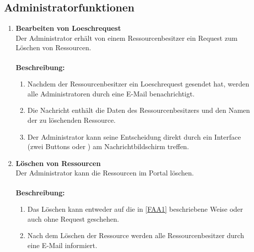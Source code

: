 \documentclass[parskip=full,11pt]{scrartcl}
\def\threedigits#1{%
  \ifnum#1<10 0\fi
  \ifnum#1<1 0\fi
  \number#1}
\begin{document}
\subsection{Administratorfunktionen}
\begin{enumerate}[label={\textbf{/F\protect\threedigits{\theenumi}0/}}, leftmargin=*, resume]
\item \label{FAA1}\textbf{Bearbeiten von Loeschrequest}\\ Der Administrator erhält von einem Ressourcenbesitzer ein Request zum Löschen von Ressourcen.\\\\
\textbf{Beschreibung:}\\
\begin{enumerate}[label=(\arabic*), leftmargin=*]
\item Nachdem der Ressourcenbesitzer ein Loeschrequest gesendet hat, werden alle Administratoren durch eine E-Mail benachrichtigt.\\
\item Die Nachricht enthält die Daten des Ressourcenbesitzers und den Namen der zu löschenden Ressource.\\ 
\item Der Administrator kann seine Entscheidung direkt durch ein Interface (zwei Buttons \grqq  \: oder \grqq  \:) am Nachrichtbildschirm treffen.
 
\end{enumerate}


\item \label{FAA2} \textbf{Löschen von Ressourcen}\\ Der Administrator kann die Ressourcen im Portal löschen.\\\\
\textbf{Beschreibung:}\\
\begin{enumerate}[label=(\arabic*), leftmargin=*]
\item Das Löschen kann entweder auf die in \ref{FAA1} beschriebene Weise oder auch ohne Request geschehen.\\
\item Nach dem Löschen der Ressource werden alle Ressourcenbesitzer durch eine E-Mail  informiert. \\ 
\end{enumerate}


\end{enumerate}
\end{document}
